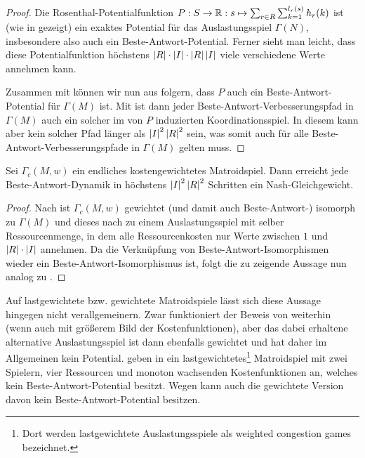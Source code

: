 \begin{proof}
	Die Rosenthal-Potentialfunktion $P: S \to \mathbb{R}: s \mapsto \sum_{r \in R}\sum_{k=1}^{l_r(s)} h_r(k)$ ist (wie in  gezeigt) ein exaktes Potential für das Auslastungsspiel $\Gamma(N)$, insbesondere also auch ein Beste-Antwort-Potential. Ferner sieht man leicht, dass diese Potentialfunktion höchstens $\left|R\right|\cdot\left|I\right|\cdot \left|R\right|\left|I\right|$ viele verschiedene Werte annehmen kann.
	
	Zusammen mit  können wir nun aus  folgern, dass $P$ auch ein Beste-Antwort-Potential für $\Gamma(M)$ ist. Mit  ist dann jeder Beste-Antwort-Verbesserungspfad in $\Gamma(M)$ auch ein solcher im von $P$ induzierten Koordinationsspiel. In diesem kann aber kein solcher Pfad länger als $\left|I\right|^2\left|R\right|^2$ sein, was somit auch für alle Beste-Antwort-Verbesserungspfade in $\Gamma(M)$ gelten muss.
\end{proof}

\begin{kor}
	Sei $\Gamma_c(M,w)$ ein endliches kostengewichtetes Matroidspiel. Dann erreicht jede Beste-Antwort-Dynamik in höchstens $\left|I\right|^2\left|R\right|^2$ Schritten ein Nash-Gleichgewicht.
\end{kor}

\begin{proof}
	Nach  ist $\Gamma_c(M,w)$ gewichtet (und damit auch Beste-Antwort-) isomorph zu $\Gamma(M)$ und dieses nach  zu einem Auslastungsspiel mit selber Ressourcenmenge, in dem alle Ressourcenkosten nur Werte zwischen $1$ und $\left|R\right|\cdot\left|I\right|$ annehmen. Da die Verknüpfung von Beste-Antwort-Isomorphismen wieder ein Beste-Antwort-Isomorphismus ist, folgt die zu zeigende Aussage nun analog zu . 
\end{proof}

Auf lastgewichtete bzw. gewichtete Matroidspiele lässt sich diese Aussage hingegen nicht verallgemeinern. Zwar funktioniert der Beweis von  weiterhin (wenn auch mit größerem Bild der Kostenfunktionen), aber das dabei erhaltene alternative Auslastungsspiel ist dann ebenfalls gewichtet und hat daher im Allgemeinen kein Potential. \citeauthor{NGinGewMatroidSpielen} geben in \cite[Theorem 14]{NGinGewMatroidSpielen} ein lastgewichtetes\footnote{Dort werden lastgewichtete Auslastungsspiele als \glqq weighted congestion games\grqq{} bezeichnet.} Matroidspiel mit zwei Spielern, vier Ressourcen und monoton wachsenden Kostenfunktionen an, welches kein Beste-Antwort-Potential besitzt. Wegen  kann auch die gewichtete Version davon kein Beste-Antwort-Potential besitzen.



